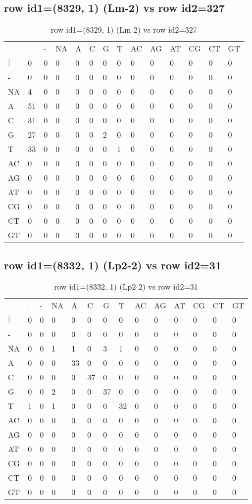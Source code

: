 \subsection{row id1=(8329, 1) (Lm-2) vs row id2=327}
\begin{center}
\begin{longtable}{|l|l|l|l|l|l|l|l|l|l|l|l|l|l|}
\caption{row id1=(8329, 1) (Lm-2) vs row id2=327} \label{table_dm328}\\
\hline
\\
\hline
&$|$&-&NA&A&C&G&T&AC&AG&AT&CG&CT&GT\\
$|$&0&0&0&0&0&0&0&0&0&0&0&0&0\\
-&0&0&0&0&0&0&0&0&0&0&0&0&0\\
NA&4&0&0&0&0&0&0&0&0&0&0&0&0\\
A&51&0&0&0&0&0&0&0&0&0&0&0&0\\
C&31&0&0&0&0&0&0&0&0&0&0&0&0\\
G&27&0&0&0&0&2&0&0&0&0&0&0&0\\
T&33&0&0&0&0&0&1&0&0&0&0&0&0\\
AC&0&0&0&0&0&0&0&0&0&0&0&0&0\\
AG&0&0&0&0&0&0&0&0&0&0&0&0&0\\
AT&0&0&0&0&0&0&0&0&0&0&0&0&0\\
CG&0&0&0&0&0&0&0&0&0&0&0&0&0\\
CT&0&0&0&0&0&0&0&0&0&0&0&0&0\\
GT&0&0&0&0&0&0&0&0&0&0&0&0&0\\
\hline
\end{longtable}
\end{center}

\subsection{row id1=(8332, 1) (Lp2-2) vs row id2=31}
\begin{center}
\begin{longtable}{|l|l|l|l|l|l|l|l|l|l|l|l|l|l|}
\caption{row id1=(8332, 1) (Lp2-2) vs row id2=31} \label{table_dm330}\\
\hline
\\
\hline
&$|$&-&NA&A&C&G&T&AC&AG&AT&CG&CT&GT\\
$|$&0&0&0&0&0&0&0&0&0&0&0&0&0\\
-&0&0&0&0&0&0&0&0&0&0&0&0&0\\
NA&0&0&1&1&0&3&1&0&0&0&0&0&0\\
A&0&0&0&33&0&0&0&0&0&0&0&0&0\\
C&0&0&0&0&37&0&0&0&0&0&0&0&0\\
G&0&0&2&0&0&37&0&0&0&0&0&0&0\\
T&1&0&1&0&0&0&32&0&0&0&0&0&0\\
AC&0&0&0&0&0&0&0&0&0&0&0&0&0\\
AG&0&0&0&0&0&0&0&0&0&0&0&0&0\\
AT&0&0&0&0&0&0&0&0&0&0&0&0&0\\
CG&0&0&0&0&0&0&0&0&0&0&0&0&0\\
CT&0&0&0&0&0&0&0&0&0&0&0&0&0\\
GT&0&0&0&0&0&0&0&0&0&0&0&0&0\\
\hline
\end{longtable}
\end{center}

